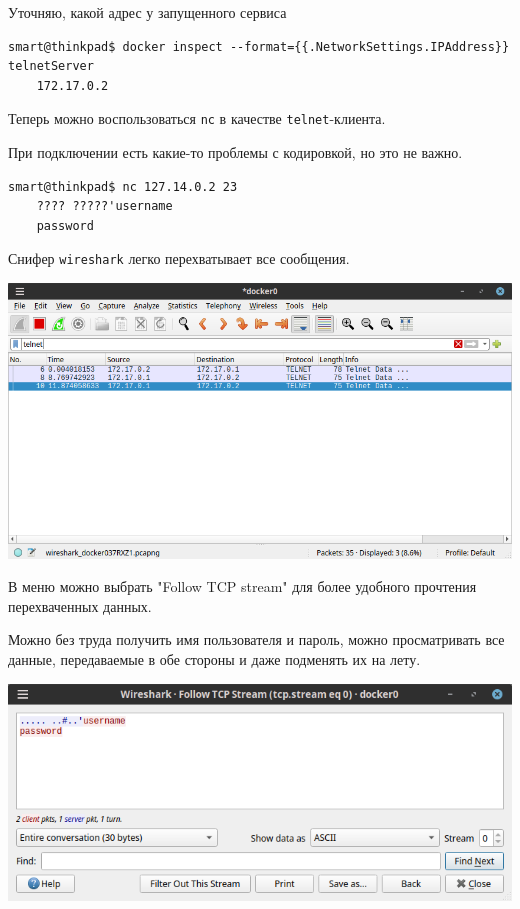 Уточняю, какой адрес у запущенного сервиса
\begin{Verbatim}[frame=single]
    smart@thinkpad$ docker inspect --format={{.NetworkSettings.IPAddress}} telnetServer
    172.17.0.2
\end{Verbatim}

Теперь можно воспользоваться \texttt{nc} в качестве \texttt{telnet}-клиента.

При подключении есть какие-то проблемы с кодировкой, но это не важно.

\begin{Verbatim}[frame=single]
    smart@thinkpad$ nc 127.14.0.2 23
    ???? ?????'username
    password
\end{Verbatim}

\newpage

Снифер \texttt{wireshark} легко перехватывает все сообщения.
\begin{center}
    \includegraphics[scale=0.55]{res/5.wireshark-telnet.png}
\end{center}

В меню можно выбрать "Follow TCP stream" для более удобного прочтения перехваченных данных.

Можно без труда получить имя пользователя и пароль, можно просматривать все данные, передаваемые в обе стороны и даже подменять их на лету.

\begin{center}
    \includegraphics[scale=0.7]{res/5.wireshark-follow-stream.png}
\end{center}

